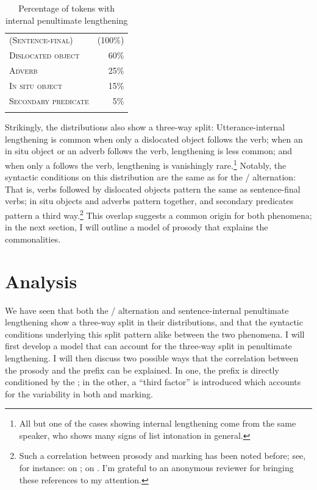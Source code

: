 \documentclass[output=paper,modfonts,nonflat,hidelinks]{langsci/langscibook}
\begin{document}
\begin{table}
	\caption{Percentage of tokens with internal penultimate lengthening}
	\label{tab:kusmer:lengthening_percentages}
\begin{tabular}{lr}
	\lsptoprule
	\textsc{(Sentence-final)} & (100\%)\\
	\textsc{Dislocated object} & 60\%\\
	\midrule
	\textsc{Adverb} & 25\%\\
	\textsc{In situ object} & 15\%\\
	\midrule
	\textsc{Secondary predicate} & 5\%\\
\lspbottomrule
\end{tabular}
\end{table}

\largerpage
Strikingly, the distributions also show a three-way split: Utterance-internal
lengthening is common when only a dislocated object follows the verb; when an
 {in situ} object or an adverb follows the verb, lengthening is less
common; and when only a  follows the verb, lengthening is
vanishingly rare.\footnote{All but one of the  cases showing
internal lengthening come from the same speaker, who shows many signs of list
intonation in general.} Notably, the syntactic conditions on this distribution
are the same as for the \slash {} alternation: That is, verbs
followed by dislocated objects pattern the same as sentence-final verbs;
 {in situ} objects and adverbs pattern together, and secondary predicates
pattern a third way.\footnote{Such a correlation between prosody and 
marking has been noted before; see, for instance: \cite{vanderSpuy1993,
Buell2005, chengdowning2012} on ; \cite{Devos2008} on . I'm grateful
to an anonymous reviewer for bringing these references to my attention.} This
overlap suggests a common origin for both phenomena; in the next section, I
will outline a model of  prosody that explains the commonalities.

\section{Analysis}\label{sec:kusmer:analysis}

We have seen that both the \slash {} alternation and
sentence-internal penultimate lengthening show a three-way split in their
distributions, and that the syntactic conditions underlying this split pattern
alike between the two phenomena. I will first develop a model that can account
for the three-way split in penultimate lengthening. I will then discuss two
possible ways that the correlation between the prosody and the  prefix
can be explained. In one, the  prefix is directly conditioned by the
; in the other, a ``third factor'' is introduced which
accounts for the variability in both  and 
marking.
\end{document}
